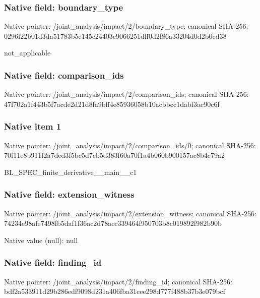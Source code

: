 \documentclass[10pt,a4paper]{article}
\begin{document}
\subsubsection{Native field: boundary\_\allowbreak{}type}
Native pointer: /joint\_\allowbreak{}analysis/impact/2/boundary\_\allowbreak{}type; canonical SHA-256: 0296f22b01d3da51783b5e145c24403c9066251dff0d2f86a33204d0d2b0cd38

\begingroup\raggedright\sloppy not\_\allowbreak{}applicable\par\endgroup

\subsubsection{Native field: comparison\_\allowbreak{}ids}
Native pointer: /joint\_\allowbreak{}analysis/impact/2/comparison\_\allowbreak{}ids; canonical SHA-256: 47f702a1f443b5f7acde2d21d8fa9bff4e85936058b10acbbcc1dabf3ac90c6f

\subsubsection{Native item 1}
Native pointer: /joint\_\allowbreak{}analysis/impact/2/comparison\_\allowbreak{}ids/0; canonical SHA-256: 70f11e8b911f2a7ded3f5bc5d7cb5d383f60a70f1a4b060b900157ac8b4e79a2

\begingroup\raggedright\sloppy BL\_\allowbreak{}SPEC\_\allowbreak{}finite\_\allowbreak{}derivative\_\allowbreak{}\_\allowbreak{}main\_\allowbreak{}\_\allowbreak{}c1\par\endgroup

\subsubsection{Native field: extension\_\allowbreak{}witness}
Native pointer: /joint\_\allowbreak{}analysis/impact/2/extension\_\allowbreak{}witness; canonical SHA-256: 74234e98afe7498fb5daf1f36ac2d78acc339464f950703b8c019892f982b90b

Native value (null): null

\subsubsection{Native field: finding\_\allowbreak{}id}
Native pointer: /joint\_\allowbreak{}analysis/impact/2/finding\_\allowbreak{}id; canonical SHA-256: bdf2a533911d29b286edf9098d231a406fba31cee298d777f488b37b3e079bcf
\end{document}
